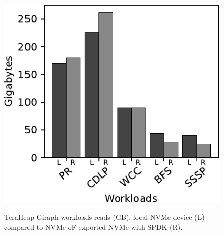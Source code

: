 \begin{figure}[H]
  \includegraphics[width=\linewidth]{figures/giraph_r.pdf}\\
\caption{TeraHeap Giraph workloads reads (GB). local NVMe device (L) compared to NVMe-oF exported NVMe with SPDK (R).}
\label{fig:giraph_r}
\end{figure}

